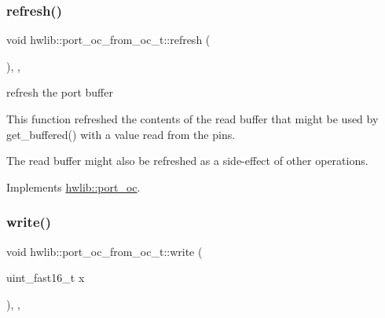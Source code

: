 \mbox{\label{classhwlib_1_1port__oc__from__oc__t_af7012c357f07fba115da4c0486d1e1d8}} 
\subsubsection{\texorpdfstring{refresh()}{refresh()}}
{\footnotesize\ttfamily void hwlib\+::port\+\_\+oc\+\_\+from\+\_\+oc\+\_\+t\+::refresh (\begin{DoxyParamCaption}{ }\end{DoxyParamCaption})\hspace{0.3cm}{\ttfamily [inline]}, {\ttfamily [override]}, {\ttfamily [virtual]}}





refresh the port buffer

This function refreshed the contents of the read buffer that might be used by get\+\_\+buffered() with a value read from the pins.

The read buffer might also be refreshed as a side-\/effect of other operations. 

Implements \hyperlink{classhwlib_1_1port__oc_aa4488183f5cf241ba48ad4dd1a89e42a}{hwlib\+::port\+\_\+oc}.

\mbox{\label{classhwlib_1_1port__oc__from__oc__t_aa3bd2d7f8e302b54a4246866d8c593b7}} 
\subsubsection{\texorpdfstring{write()}{write()}}
{\footnotesize\ttfamily void hwlib\+::port\+\_\+oc\+\_\+from\+\_\+oc\+\_\+t\+::write (\begin{DoxyParamCaption}\item[{uint\+\_\+fast16\+\_\+t}]{x }\end{DoxyParamCaption})\hspace{0.3cm}{\ttfamily [inline]}, {\ttfamily [override]}, {\ttfamily [virtual]}}





